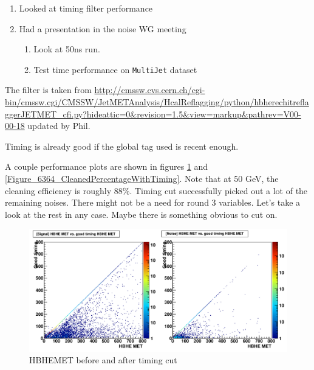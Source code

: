 

\begin{enumerate}
\item Looked at timing filter performance
\item Had a presentation in the noise WG meeting
   \begin{enumerate}
   \item Look at 50ns run.
   \item Test time performance on \texttt{MultiJet} dataset
   \end{enumerate}
\end{enumerate}


The filter is taken from
\url{http://cmssw.cvs.cern.ch/cgi-bin/cmssw.cgi/CMSSW/JetMETAnalysis/HcalReflagging/python/hbherechitreflaggerJETMET_cfi.py?hideattic=0&revision=1.5&view=markup&pathrev=V00-00-18}
updated by Phil.

Timing is already good if the global tag used is recent enough.

A couple performance plots are shown in figures \ref{Figure_6364_TimingHBHEMET} and \ref{Figure_6364_CleanedPercentageWithTiming}.
Note that at 50 GeV, the cleaning efficiency is roughly 88\%.  Timing cut successfully picked out a lot of the remaining noises.
There might not be a need for round 3 variables.  Let's take a look at the rest in any case.
Maybe there is something obvious to cut on.

\begin{figure}
   \includegraphics[width=120mm]{DailyLog/6364/6364_Comparison10_Comparison_HHBHEMETVsGoodTimingHBHEMET}
   \caption{HBHEMET before and after timing cut}
   \label{Figure_6364_TimingHBHEMET}
\end{figure}

